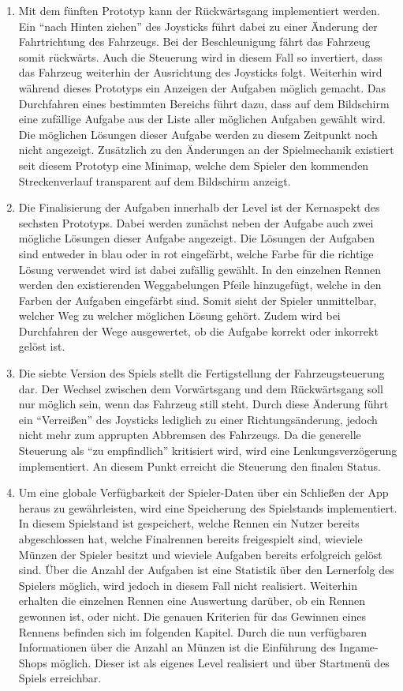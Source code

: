 \begin{enumerate}[label=Prototyp \arabic*]
		\item{ Mit dem fünften Prototyp kann der Rückwärtsgang implementiert werden. Ein \enquote{nach Hinten ziehen} des Joysticks führt dabei zu einer Änderung der Fahrtrichtung des Fahrzeugs. Bei der Beschleunigung fährt das Fahrzeug somit rückwärts. Auch die Steuerung wird in diesem Fall so invertiert, dass das Fahrzeug weiterhin der Ausrichtung des Joysticks folgt. Weiterhin wird während dieses Prototyps ein Anzeigen der Aufgaben möglich gemacht. Das Durchfahren eines bestimmten Bereichs führt dazu, dass auf dem Bildschirm eine zufällige Aufgabe aus der Liste aller möglichen Aufgaben gewählt wird. Die möglichen Lösungen dieser Aufgabe werden zu diesem Zeitpunkt noch nicht angezeigt. Zusätzlich zu den Änderungen an der Spielmechanik existiert seit diesem Prototyp eine Minimap, welche dem Spieler den kommenden Streckenverlauf transparent auf dem Bildschirm anzeigt. }
		\item{ Die Finalisierung der Aufgaben innerhalb der Level ist der Kernaspekt des sechsten Prototyps. Dabei werden zunächst neben der Aufgabe auch zwei mögliche Lösungen dieser Aufgabe angezeigt. Die Lösungen der Aufgaben sind entweder in blau oder in rot eingefärbt, welche Farbe für die richtige Lösung verwendet wird ist dabei zufällig gewählt. In den einzelnen Rennen werden den existierenden Weggabelungen Pfeile hinzugefügt, welche in den Farben der Aufgaben eingefärbt sind. Somit sieht der Spieler unmittelbar, welcher Weg zu welcher möglichen Lösung gehört. Zudem wird bei Durchfahren der Wege ausgewertet, ob die Aufgabe korrekt oder inkorrekt gelöst ist. }
		\item{ Die siebte Version des Spiels stellt die Fertigstellung der Fahrzeugsteuerung dar. Der Wechsel zwischen dem Vorwärtsgang und dem Rückwärtsgang soll nur möglich sein, wenn das Fahrzeug still steht. Durch diese Änderung führt ein \enquote{Verreißen} des Joysticks lediglich zu einer Richtungsänderung, jedoch nicht mehr zum apprupten Abbremsen des Fahrzeugs. Da die generelle Steuerung als \enquote{zu empfindlich} kritisiert wird, wird eine Lenkungsverzögerung implementiert. An diesem Punkt erreicht die Steuerung den finalen Status.}
		\item{ Um eine globale Verfügbarkeit der Spieler-Daten über ein Schließen der App heraus zu gewährleisten, wird eine Speicherung des Spielstands implementiert. In diesem Spielstand ist gespeichert, welche Rennen ein Nutzer bereits abgeschlossen hat, welche Finalrennen bereits freigespielt sind, wieviele Münzen der Spieler besitzt und wieviele Aufgaben bereits erfolgreich gelöst sind. Über die Anzahl der Aufgaben ist eine Statistik über den Lernerfolg des Spielers möglich, wird jedoch in diesem Fall nicht realisiert. Weiterhin erhalten die einzelnen Rennen eine Auswertung darüber, ob ein Rennen gewonnen ist, oder nicht. Die genauen Kriterien für das Gewinnen eines Rennens befinden sich im folgenden Kapitel. Durch die nun verfügbaren Informationen über die Anzahl an Münzen ist die Einführung des Ingame-Shops möglich. Dieser ist als eigenes Level realisiert und über Startmenü des Spiels erreichbar.}

\end{enumerate}
